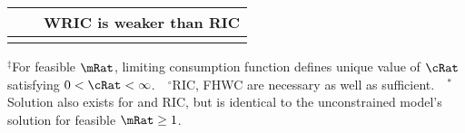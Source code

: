 \begin{table}
{\begin{tabular}{|l|l|l|}
\\                                          &                                 & WRIC is weaker than RIC
\\ \hline \multicolumn{3}{c}{}
\end{tabular}
} %

\settowidth\TableWidth{\usebox{\Required}}
\usebox{\Required}

\parbox{\TableWidth}{\footnotesize         $^{\ddagger}$For feasible $\mRat$, limiting consumption function defines unique value of $\cRat$ satisfying $0 < \cRat < \infty$.~~$^{\circ}$RIC, FHWC are necessary as well as sufficient.~~$^{\ast}$Solution also exists for  and RIC, but is identical to the unconstrained model's solution for feasible $\mRat \geq 1$.}

\end{table}


